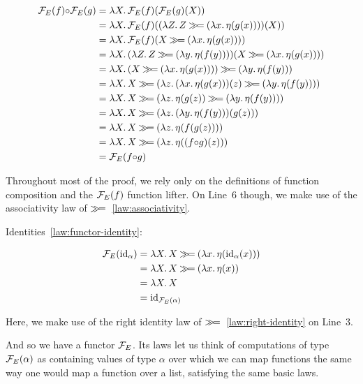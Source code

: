 \setcounter{TemporaryCounter}{\value{equation}}
\setcounter{equation}{0}
\NoChapterPrefix
\begin{align}
  \FF_E(f) \compop \FF_E(g)
  &= \lam{X}{\FF_E(f)(\FF_E(g)(X))} \\
  &= \lam{X}{\FF_E(f)((\lam{Z}{Z \hsbind (\lam{x}{\eta(g(x))})})(X))} \\
  &= \lam{X}{\FF_E(f)(X \hsbind (\lam{x}{\eta(g(x))}))} \\
  &= \lam{X}{(\lam{Z}{Z \hsbind (\lam{y}{\eta(f(y))})})(X \hsbind (\lam{x}{\eta(g(x))}))} \\
  &= \lam{X}{(X \hsbind (\lam{x}{\eta(g(x))})) \hsbind (\lam{y}{\eta(f(y))})} \\
  &= \lam{X}{X \hsbind (\lam{z}{(\lam{x}{\eta(g(x))})(z) \hsbind (\lam{y}{\eta(f(y))})})} \\
  &= \lam{X}{X \hsbind (\lam{z}{\eta(g(z)) \hsbind (\lam{y}{\eta(f(y))})})} \\
  &= \lam{X}{X \hsbind (\lam{z}{(\lam{y}{\eta(f(y))})(g(z))})} \\
  &= \lam{X}{X \hsbind (\lam{z}{\eta(f(g(z)))})} \\
  &= \lam{X}{X \hsbind (\lam{z}{\eta((f \compop g)(z))})} \\
  &= \FF_E(f \compop g)
\end{align}
\setcounter{equation}{\value{TemporaryCounter}}
\ChapterPrefix

Throughout most of the proof, we rely only on the definitions of function
composition and the $\mathcal{F}_E(f)$ function lifter. On Line~6 though, we make
use of the associativity law of $\mathbin{\gg\!=}$~\eqref{law:associativity}.

Identities~\eqref{law:functor-identity}:

\setcounter{TemporaryCounter}{\value{equation}}
\setcounter{equation}{0}
\NoChapterPrefix
\begin{align}
  \mathcal{F}_E(\mathrm{id}_\alpha)
  &= \lambda X.\, X \mathbin{\gg\!=} (\lambda x.\, \eta(\mathrm{id}_\alpha(x))) \\
  &= \lambda X.\, X \mathbin{\gg\!=} (\lambda x.\, \eta(x)) \\
  &= \lambda X.\, X \\
  &= \mathrm{id}_{\mathcal{F}_E(\alpha)}
\end{align}
\setcounter{equation}{\value{TemporaryCounter}}
\ChapterPrefix

Here, we make use of the right identity law of
$\mathbin{\gg\!=}$~\eqref{law:right-identity} on Line~3.

And so we have a functor $\mathcal{F}_E$. Its laws let us think of computations of
type $\mathcal{F}_E(\alpha)$ as containing values of type $\alpha$ over which we
can map functions the same way one would map a function over a list,
satisfying the same basic laws.


